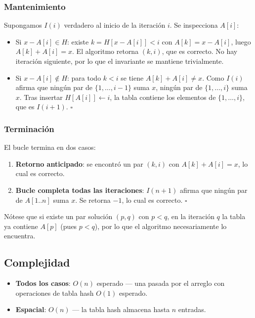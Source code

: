 \documentclass[11pt,a4paper]{article}
\newcommand{\inv}{I}
\begin{document}
\subsubsection{Mantenimiento}
Supongamos $\inv(i)$ verdadero al inicio de la iteración $i$. Se inspecciona $A[i]$:
\begin{itemize}
    \item Si $x - A[i] \in H$: existe $k = H[x - A[i]] < i$ con $A[k] = x - A[i]$, luego $A[k] + A[i] = x$. El algoritmo retorna $(k, i)$, que es correcto. No hay iteración siguiente, por lo que el invariante se mantiene trivialmente.
    \item Si $x - A[i] \notin H$: para todo $k < i$ se tiene $A[k] + A[i] \neq x$. Como $\inv(i)$ afirma que ningún par de $\{1, \ldots, i-1\}$ suma $x$, ningún par de $\{1, \ldots, i\}$ suma $x$. Tras insertar $H[A[i]] \gets i$, la tabla contiene los elementos de $\{1, \ldots, i\}$, que es $\inv(i+1)$. $\square$
\end{itemize}

\subsubsection{Terminación}
El bucle termina en dos casos:
\begin{enumerate}
    \item \textbf{Retorno anticipado}: se encontró un par $(k, i)$ con $A[k] + A[i] = x$, lo cual es correcto.
    \item \textbf{Bucle completa todas las iteraciones}: $\inv(n+1)$ afirma que ningún par de $A[1..n]$ suma $x$. Se retorna $-1$, lo cual es correcto. $\square$
\end{enumerate}
Nótese que si existe un par solución $(p, q)$ con $p < q$, en la iteración $q$ la tabla ya contiene $A[p]$ (pues $p < q$), por lo que el algoritmo necesariamente lo encuentra.

\subsection{Complejidad}
\begin{itemize}
    \item \textbf{Todos los casos}: $O(n)$ esperado --- una pasada por el arreglo con operaciones de tabla hash $O(1)$ esperado.
    \item \textbf{Espacial}: $O(n)$ --- la tabla hash almacena hasta $n$ entradas.
\end{itemize}
\end{document}
